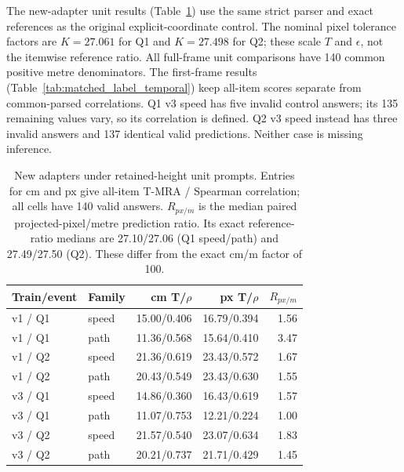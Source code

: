 \documentclass[11pt]{article}
\begin{document}
The new-adapter unit results (Table~\ref{tab:matched_label_units}) use the
same strict parser and exact references as the original explicit-coordinate
control. The nominal pixel tolerance factors are $K=27.061$ for Q1 and
$K=27.498$ for Q2; these scale $T$ and $\epsilon$, not the itemwise reference
ratio. All full-frame unit comparisons have 140 common positive metre
denominators. The first-frame results (Table~\ref{tab:matched_label_temporal})
keep all-item scores separate from common-parsed correlations. Q1 v3 speed
has five invalid control answers; its 135 remaining values vary, so its
correlation is defined. Q2 v3 speed instead has three invalid answers and
137 identical valid predictions. Neither case is missing inference.

\begin{table}[t]
\centering\small
\setlength{\tabcolsep}{4pt}
\caption{New adapters under retained-height unit prompts. Entries for cm
and px give all-item T-MRA / Spearman correlation; all cells have 140 valid
answers. $R_{px/m}$ is the median paired projected-pixel/metre prediction
ratio. Its exact reference-ratio medians are 27.10/27.06 (Q1 speed/path)
and 27.49/27.50 (Q2). These differ from the exact cm/m factor of 100.}
\label{tab:matched_label_units}
\begin{tabular}{llrrr}
\toprule
Train/event & Family & cm T/$\rho$ & px T/$\rho$ & $R_{px/m}$ \\
\midrule
v1 / Q1 & speed & 15.00/0.406 & 16.79/0.394 & 1.56 \\
v1 / Q1 & path & 11.36/0.568 & 15.64/0.410 & 3.47 \\
v1 / Q2 & speed & 21.36/0.619 & 23.43/0.572 & 1.67 \\
v1 / Q2 & path & 20.43/0.549 & 23.43/0.630 & 1.55 \\
v3 / Q1 & speed & 14.86/0.360 & 16.43/0.619 & 1.57 \\
v3 / Q1 & path & 11.07/0.753 & 12.21/0.224 & 1.00 \\
v3 / Q2 & speed & 21.57/0.540 & 23.07/0.634 & 1.83 \\
v3 / Q2 & path & 20.21/0.737 & 21.71/0.429 & 1.45 \\
\bottomrule
\end{tabular}
\end{table}
\end{document}
